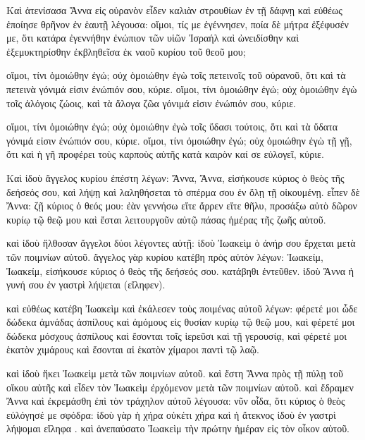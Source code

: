 \pend\pstart
{}

\pend\pstart
Καὶ ἀτενίσασα Ἄννα εἰς οὐρανὸν εἶδεν καλιὰν στρουθίων ἐν τῇ δάφνῃ καὶ εὐθέως ἐποίησε θρῆνον ἐν ἑαυτῇ λέγουσα: οἴμοι, τίς με ἐγέννησεν, ποία δὲ μήτρα ἐξέφυσέν με, ὅτι κατάρα ἐγεννήθην ἐνώπιον τῶν υἱῶν Ἰσραήλ καὶ ὠνειδίσθην καὶ ἐξεμυκτηρίσθην ἐκβληθεῖσα ἐκ ναοῦ κυρίου τοῦ θεοῦ μου;

\pend\pstart
οἴμοι, τίνι ὁμοιώθην ἐγώ; οὐχ ὁμοιώθην ἐγὼ τοῖς πετεινοῖς τοῦ οὐρανοῦ, ὅτι καὶ τὰ πετεινὰ γόνιμά εἰσιν ἐνώπιόν σου, κύριε. οἴμοι, τίνι ὁμοιώθην ἐγώ; οὐχ ὁμοιώθην ἐγὼ τοῖς ἀλόγοις ζώοις, καὶ τὰ ἄλογα ζῶα γόνιμά εἰσιν ἐνώπιόν σου, κύριε.

\pend\pstart
οἴμοι, τίνι ὁμοιώθην ἐγώ; οὐχ ὁμοιώθην ἐγὼ τοῖς ὕδασι τούτοις, ὅτι καὶ τὰ ὕδατα γόνιμά εἰσιν ἐνώπιόν σου, κύριε. οἴμοι, τίνι ὁμοιώθην ἐγώ; οὐχ ὁμοιώθην ἐγὼ τῇ γῇ, ὅτι καὶ ἡ γῆ προφέρει τοὺς καρποὺς αὐτῆς κατὰ καιρὸν καί σε εὐλογεῖ, κύριε.

\pend\pstart
{}

\pend\pstart
Καὶ ἰδοὺ ἄγγελος κυρίου ἐπέστη λέγων: Ἄννα, Ἄννα, εἰσήκουσε κύριος ὁ θεὸς τῆς δεήσεός σου, καὶ λήψῃ καὶ λαληθήσεται τὸ σπέρμα σου ἐν ὅλῃ τῇ οἰκουμένῃ. εἶπεν δὲ Ἄννα: ζῇ κύριος ὁ θεός μου: ἐὰν γεννήσω εἴτε ἄρρεν εἴτε θῆλυ, προσάξω αὐτὸ δῶρον κυρίῳ τῷ θεῷ μου καὶ ἔσται λειτουργοῦν αὐτῷ πάσας ἡμέρας τῆς ζωῆς αὐτοῦ.

\pend\pstart
καὶ ἰδοὺ ἤλθοσαν ἄγγελοι δύοι λέγοντες αὐτῇ: ἰδοὺ Ἰωακεὶμ ὁ ἀνήρ σου ἔρχεται μετὰ τῶν ποιμνίων αὐτοῦ. ἄγγελος γὰρ κυρίου κατέβη πρὸς αὐτὸν λέγων: Ἰωακείμ, Ἰωακείμ, εἰσήκουσε κύριος ὁ θεὸς τῆς δεήσεός σου. κατάβηθι ἐντεῦθεν. ἰδοὺ Ἄννα ἡ γυνή σου ἐν γαστρὶ λήψεται (εἴληφεν).

\pend\pstart
καὶ εὐθέως κατέβη Ἰωακεὶμ καὶ ἐκάλεσεν τοὺς ποιμένας αὐτοῦ λέγων: φέρετέ μοι ὧδε δώδεκα ἀμνάδας ἀσπίλους καὶ ἀμόμους εἰς θυσίαν κυρίῳ τῷ θεῷ μου, καὶ φέρετέ μοι δώδεκα μόσχους ἀσπίλους καὶ ἔσονται τοῖς ἱερεῦσι καὶ τῇ γερουσίᾳ, καὶ φέρετέ μοι ἑκατὸν χιμάρους καὶ ἔσονται αἱ ἑκατὸν χίμαροι παντὶ τῷ λαῷ.

\pend\pstart
καὶ ἰδοὺ ἥκει Ἰωακεὶμ μετὰ τῶν ποιμνίων αὐτοῦ. καὶ ἔστη Ἄννα πρὸς τῇ πύλῃ τοῦ οἴκου αὐτῆς καὶ εἶδεν τὸν Ἰωακεὶμ ἐρχόμενον μετὰ τῶν ποιμνίων αὐτοῦ. καὶ ἔδραμεν Ἄννα καὶ ἐκρεμάσθη ἐπὶ τὸν τράχηλον αὐτοῦ λέγουσα: νῦν οἶδα, ὅτι κύριος ὁ θεὸς εὐλόγησέ με σφόδρα: ἰδοὺ γὰρ ἡ χήρα οὐκέτι χήρα καὶ ἡ ἄτεκνος ἰδοὺ ἐν γαστρὶ λήψομαι εἴληφα . καὶ ἀνεπαύσατο Ἰωακεὶμ τὴν πρώτην ἡμέραν εἰς τὸν οἶκον αὐτοῦ.

\pend\pstart
{}

